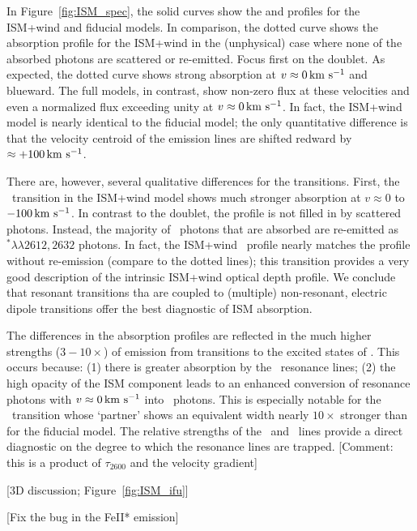 \documentclass[12pt,preprint]{aastex}
\begin{document}
In Figure~\ref{fig:ISM_spec}, the solid curves show the  and
 profiles for the ISM+wind and fiducial 
models. In comparison, the
dotted curve shows the absorption profile for the ISM+wind in the (unphysical) case
where none of the absorbed photons are scattered or re-emitted.   Focus first on the
 doublet.  As expected, the dotted curve shows strong
absorption at $v \approx 0 \, {\rm km~s^{-1}}$ and blueward.  The full models,
in contrast, show non-zero flux at these velocities and even a
normalized flux exceeding unity at $v \approx 0 \, {\rm km~s^{-1}}$.  In
fact, the ISM+wind model is nearly identical to the fiducial model;
the only quantitative difference is that the velocity centroid of
the emission lines are shifted redward by $\approx +100 \, {\rm km~s^{-1}}$.

There are, however, several qualitative differences 
for the  transitions. 
First, the \feiia\ transition in the ISM+wind model
shows much stronger absorption at $v \approx 0$
to $-100 \, {\rm km~s^{-1}}$.  In contrast to the  doublet,
the profile is not filled in by scattered photons. Instead, 
the majority of \feiia\ photons that are absorbed are re-emitted as
~$^* \lambda\lambda 2612, 2632$ photons.  In fact, the
ISM+wind \feiia\ profile nearly matches the profile without re-emission 
(compare to the dotted lines); this transition provides a
very good description of the intrinsic ISM+wind optical depth profile.  
We conclude that resonant transitions tha are coupled to (multiple)
non-resonant, electric dipole transitions offer the best
diagnostic of ISM absorption.

The differences in the  absorption profiles are reflected
in the much higher strengths ($3-10\times$) of emission from
transitions to the excited states of \aconfig.   This occurs because:
(1) there is greater absorption by the \feiid\
resonance lines; (2) the high opacity of the ISM component leads to
an enhanced conversion of resonance photons with $v \approx 0\, {\rm km~s^{-1}}$
into \feiis\ photons.  This is especially notable for the
\feiib\ transition whose `partner' shows an equivalent width nearly
$10\times$ stronger than for the fiducial model.  The relative
strengths of the \feiib\ and \feiie\ lines provide a direct
diagnostic on the degree to which the resonance lines are trapped.
[Comment:  this is a product of $\tau_{2600}$ and the velocity
gradient]

[3D discussion; Figure~\ref{fig:ISM_ifu}]

[Fix the bug in the FeII* emission]
\end{document}
